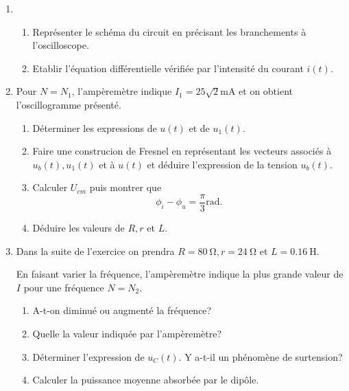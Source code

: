 \documentclass[a4paper]{article}
\begin{document}
\begin{enumerate}
	\item \begin{enumerate}[label=(\alph*)]
		\item Représenter le schéma du circuit en précisant les branchements à l'oscilloscope.
		\item Etablir l'équation différentielle vérifiée par l'intensité du courant $i(t)$.
	\end{enumerate}
\item Pour  $N=N_1$, l'ampèremètre indique $I_1=25\sqrt{2}\si{\milli\A}$ et on obtient l'oscillogramme présenté.
	\begin{enumerate}[label=(\alph*)]
		\item	Déterminer les expressions de $u(t)$ et de $u_1(t)$.
\item Faire une construcion de Fresnel en représentant les vecteurs associés à $u_b(t), u_1(t)$ et à $u(t)$ et déduire l'expression de la tension $u_b(t)$.
\item Calculer  $U_{cm}$ puis montrer que \[
		\phi_i-\phi_u=\frac{\pi}{3}\si{\radian}
.\] 
\item Déduire les valeurs de $R, r$ et $L$.
	\end{enumerate}
\item Dans la suite de l'exercice on prendra $R=\SI{80}{\ohm}, r=\SI{24}{\ohm}$ et $L=\SI{0.16}{\henry}$.

	En faisant varier la fréquence, l'ampèremètre indique la plus grande valeur de $I$ pour une fréquence $N=N_2$.


	\begin{minipage}{0.5\textwidth}
	\begin{enumerate}[label=(\alph*)]
		\item A-t-on diminué ou augmenté la fréquence?
		\item Quelle la valeur indiquée par l'ampèremètre?
		\item Déterminer l'expression de $u_C(t)$. Y a-t-il un phénomène de surtension?
		\item Calculer la puissance moyenne absorbée par le dipôle.
	\end{enumerate}
\end{minipage}%
\begin{minipage}{0.5\textwidth}
	\centering
{}
\end{minipage}
\end{enumerate}
\end{document}
